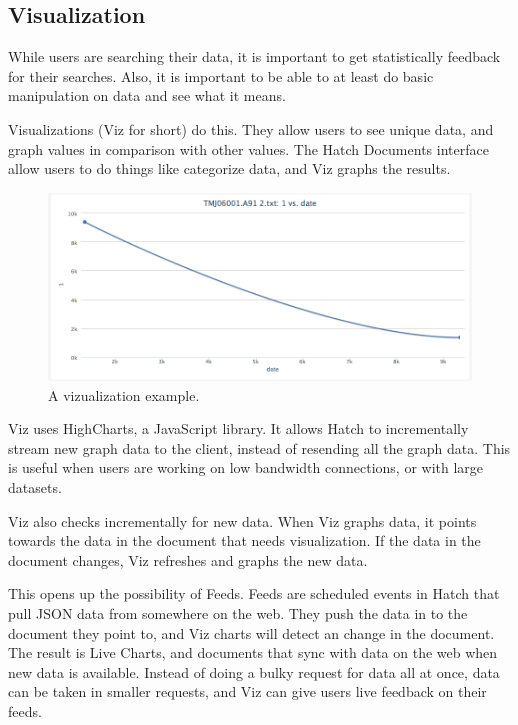 \subsection{Visualization}
While users are searching their data, it is important to get statistically feedback
for their searches. Also, it is important to be able to at least do basic manipulation
on data and see what it means.

Visualizations (Viz for short) do this. They allow users to see unique data, and graph 
values in comparison with other values. The Hatch Documents interface allow users to do 
things like categorize data, and Viz graphs the results.

\begin{figure}[h]
	\begin{center}
	\includegraphics[width=120mm]{images/viz_ex1}
	\caption{A vizualization example.} 
	\label{viz_ex1}
	\end{center}
\end{figure}

Viz uses HighCharts, a JavaScript library. It allows Hatch to incrementally stream
new graph data to the client, instead of resending all the graph data. This is useful
when users are working on low bandwidth connections, or with large datasets. 

Viz also checks incrementally for new data. When Viz graphs data, it points towards the 
data in the document that needs visualization. If the data in the document changes,
Viz refreshes and graphs the new data.

This opens up the possibility of Feeds. Feeds are scheduled events in Hatch that pull
JSON data from somewhere on the web. They push the data in to the document they point
to, and Viz charts will detect an change in the document. 
The result is Live Charts, and documents that sync with data on the web when new data is 
available. Instead of doing a bulky request for data all at once, data can be taken
in smaller requests, and Viz can give users live feedback on their feeds.
